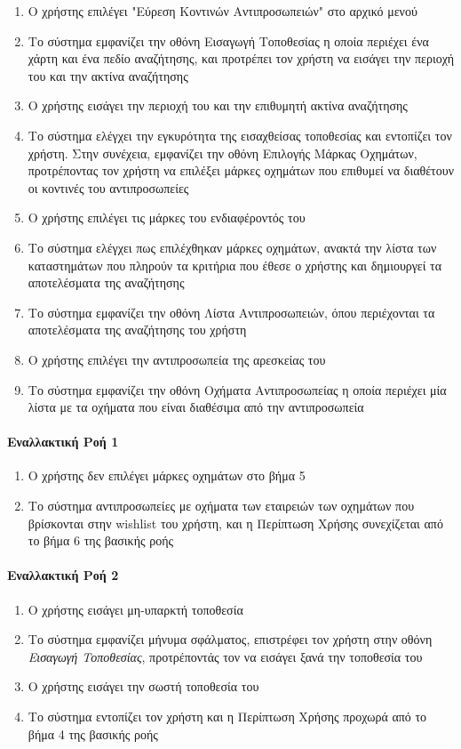\documentclass{../ol-softwaremanual}
\begin{document}
	\begin{enumerate}
		\item Ο χρήστης επιλέγει  \en"\gr Εύρεση Κοντινών Αντιπροσωπειών\en" \gr στο αρχικό μενού
		\item Το σύστημα εμφανίζει την οθόνη Εισαγωγή Τοποθεσίας η οποία περιέχει ένα χάρτη και ένα πεδίο αναζήτησης, και προτρέπει τον χρήστη να εισάγει την περιοχή του και την ακτίνα αναζήτησης
		\item Ο χρήστης εισάγει την περιοχή του και την επιθυμητή ακτίνα αναζήτησης		
		\item Το σύστημα ελέγχει την εγκυρότητα της εισαχθείσας τοποθεσίας και εντοπίζει τον χρήστη. Στην συνέχεια, εμφανίζει την οθόνη Επιλογής Μάρκας Οχημάτων, προτρέποντας τον χρήστη να επιλέξει μάρκες οχημάτων που επιθυμεί να διαθέτουν οι κοντινές του αντιπροσωπείες
		\item Ο χρήστης επιλέγει τις μάρκες του ενδιαφέροντός του			
		\item Το σύστημα ελέγχει πως επιλέχθηκαν μάρκες οχημάτων, ανακτά την λίστα των καταστημάτων που πληρούν τα κριτήρια που έθεσε ο χρήστης και δημιουργεί τα αποτελέσματα της αναζήτησης
		\item Το σύστημα εμφανίζει την οθόνη Λίστα Αντιπροσωπειών, όπου περιέχονται τα αποτελέσματα της αναζήτησης του χρήστη
		\item Ο χρήστης επιλέγει την αντιπροσωπεία της αρεσκείας του
		\item Το σύστημα εμφανίζει την οθόνη Οχήματα Αντιπροσωπείας η οποία περιέχει μία λίστα με τα οχήματα που είναι διαθέσιμα από την αντιπροσωπεία     	
	\end{enumerate}
	
	\paragraph{Εναλλακτική Ροή 1}
	\begin{enumerate}
		\item Ο χρήστης δεν επιλέγει μάρκες οχημάτων στο βήμα 5
		\item Το σύστημα  αντιπροσωπείες με οχήματα των εταιρειών των οχημάτων που βρίσκονται στην \en wishlist \gr του χρήστη, και η Περίπτωση Χρήσης συνεχίζεται από το βήμα 6 της βασικής ροής
	\end{enumerate}
	
	\paragraph{Εναλλακτική Ροή 2}
	\begin{enumerate}
			\item Ο χρήστης εισάγει μη-υπαρκτή τοποθεσία
			\item Το σύστημα εμφανίζει μήνυμα σφάλματος, επιστρέφει τον χρήστη στην οθόνη \textit{Εισαγωγή Τοποθεσίας}, προτρέποντάς τον να εισάγει ξανά την τοποθεσία του
			\item Ο χρήστης εισάγει την σωστή τοποθεσία του
			\item Το σύστημα εντοπίζει τον χρήστη και η Περίπτωση Χρήσης προχωρά από το βήμα 4 της βασικής ροής
	\end{enumerate}
	
\end{document}
